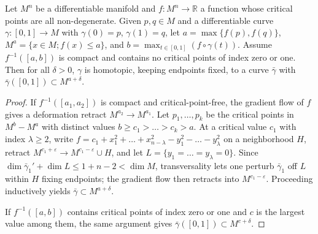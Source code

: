 \begin{lemma}
  \label{lem:dc-ch13-3-3}
  Let $M^n$ be a differentiable manifold and $f:M^n\to\mathbb{R}$ a function whose
  critical points are all non-degenerate. Given $p,q\in M$ and a differentiable curve
  $\gamma:[0,1]\to M$ with $\gamma(0)=p$, $\gamma(1)=q$, let $a=\max\{f(p),f(q)\}$,
  $M^a=\{x\in M;f(x)\leq a\}$, and $b=\max_{t\in[0,1]}(f\circ\gamma(t))$. Assume
  $f^{-1}([a,b])$ is compact and contains no critical points of index zero or one.
  Then for all $\delta>0$, $\gamma$ is homotopic, keeping endpoints fixed, to a curve
  $\bar\gamma$ with $\bar\gamma([0,1])\subset M^{a+\delta}$.
\end{lemma}
\begin{proof}
\sketch
  If $f^{-1}([a_1,a_2])$ is compact and
  critical-point-free, the gradient flow of $f$ gives a deformation retract
  $M^{a_2}\to M^{a_1}$. Let $p_1,\dots,p_k$ be the critical points in $M^b-M^a$ with
  distinct values $b\geq c_1>\dots>c_k>a$. At a critical value $c_1$ with index
  $\lambda\geq 2$, write $f=c_1+x_1^2+\dots+x_{n-\lambda}^2-y_1^2-\dots-y_\lambda^2$ on
  a neighborhood $H$, retract $M^{c_1+\varepsilon}\to M^{c_1-\varepsilon}\cup H$, and
  let $L=\{y_1=\dots=y_\lambda=0\}$. Since
  $\dim\bar\gamma_1'+\dim L\leq 1+n-2<\dim M$, transversality lets one perturb
  $\bar\gamma_1$ off $L$ within $H$ fixing endpoints; the gradient flow then retracts
  into $M^{c_1-\varepsilon}$. Proceeding inductively yields
  $\bar\gamma\subset M^{a+\delta}$.

  If $f^{-1}([a,b])$ contains critical points of index zero or one and $c$ is the
  largest value among them, the same argument gives
  $\bar\gamma([0,1])\subset M^{c+\delta}$.
\end{proof}

